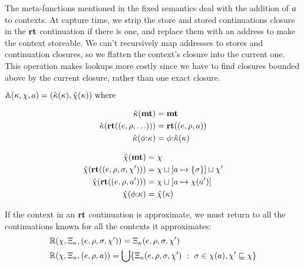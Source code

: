 The meta-functions mentioned in the fixed semantics deal with the addition of $a$ to contexts.
%
At capture time, we strip the store and stored continuations closure in the $\mathbf{rt}$ continuation if there is one, and replace them with an address to make the context storeable.
%
We can't recursively map addresses to stores and continuation closures, so we flatten the context's closure into the current one.
%
This operation makes lookups more costly since we have to find closures bounded above by the current closure, rather than one exact closure.

\newcommand{\replacectx}{\hat\mkont} %
\newcommand{\addstore}{\hat\mmktab} %
\begin{center}
  $\approximate(\mkont, \mmktab, \maddr) = (\replacectx(\mkont), \addstore(\mkont)) \text{ where}$\\
  \begin{minipage}{0.45\linewidth}
    \begin{align*}
      \replacectx(\kmt) &= \kmt \\
      \replacectx(\krt{(\mexpr,\menv,\ldots)}) &= \krt{(\mexpr,\menv,\maddr)} \\
      \replacectx(\kcons{\mkframe}{\mkont}) &=
      \kcons{\mkframe}{\replacectx(\mkont)}
    \end{align*}
  \end{minipage}
  \begin{minipage}{0.50\linewidth}
    \begin{align*}
      \addstore(\kmt) &= \mmktab \\
      \addstore(\krt{(\mexpr,\menv,\mstore,\mmktab')}) &= \joinone{\mmktab}{\maddr}{\mstore}\sqcup \mmktab' \\
      \addstore(\krt{(\mexpr,\menv,\maddr')}) &= \joinm{\mmktab}{\maddr}{\mmktab(\maddr')} \\
      \addstore(\kcons{\mkframe}{\mkont}) &= \addstore(\mkont)
    \end{align*}
  \end{minipage}
\end{center}
%
If the context in an $\mathbf{rt}$ continuation is approximate, we must return to all the continuations known for all the contexts it approximates:
\begin{align*}
  &{\mathbb R}(\chi, \Xi_\kappa, (e,\rho, \sigma, \chi')) = \Xi_\kappa(e,\rho, \sigma, \chi') \\
  &{\mathbb R}(\chi, \Xi_\kappa, (e,\rho, a)) =
    \bigcup\{ \Xi_\kappa(e,\rho,\sigma,\chi')\ :\ \sigma \in \chi(a), \chi' \sqsubseteq \chi\}
\end{align*}

